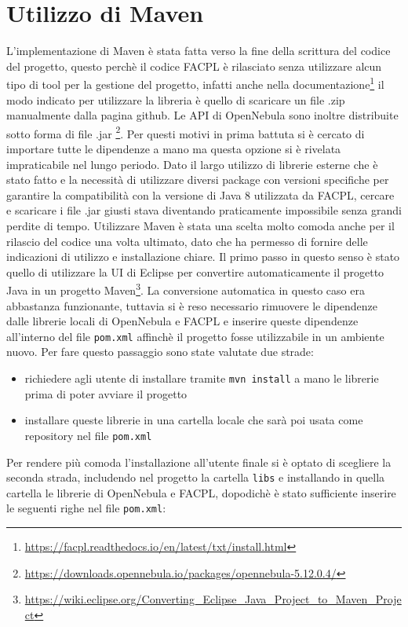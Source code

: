 \section{Utilizzo di Maven}
L'implementazione di Maven\cite{maven} è stata fatta verso la fine della scrittura del codice del progetto, questo perchè il codice FACPL è rilasciato senza utilizzare alcun tipo di tool per la gestione del progetto, infatti anche nella documentazione\footnote{\url{https://facpl.readthedocs.io/en/latest/txt/install.html}} il modo indicato per utilizzare la libreria è quello di scaricare un file .zip manualmente dalla pagina github\cite{facpl-github}. Le API di OpenNebula sono inoltre distribuite sotto forma di file .jar \footnote{\url{https://downloads.opennebula.io/packages/opennebula-5.12.0.4/}}. Per questi motivi in prima battuta si è cercato di importare tutte le dipendenze a mano ma questa opzione si è rivelata impraticabile nel lungo periodo. Dato il largo utilizzo di librerie esterne che è stato fatto e la necessità di utilizzare diversi package con versioni specifiche per garantire la compatibilità con la versione di Java 8 utilizzata da FACPL, cercare e scaricare i file .jar giusti stava diventando praticamente impossibile senza grandi perdite di tempo.\medbreak
Utilizzare Maven è stata una scelta molto comoda anche per il rilascio del codice una volta ultimato, dato che ha permesso di fornire delle indicazioni di utilizzo e installazione chiare.\medbreak
Il primo passo in questo senso è stato quello di utilizzare la UI di Eclipse per convertire automaticamente il progetto Java in un progetto Maven\footnote{\url{https://wiki.eclipse.org/Converting_Eclipse_Java_Project_to_Maven_Project}}. La conversione automatica in questo caso era abbastanza funzionante, tuttavia si è reso necessario rimuovere le dipendenze dalle librerie locali di OpenNebula e FACPL e inserire queste dipendenze all'interno del file \texttt{pom.xml} affinchè il progetto fosse utilizzabile in un ambiente nuovo. Per fare questo passaggio sono state valutate due strade:
\begin{itemize}
    \item richiedere agli utente di installare tramite \texttt{mvn install} a mano le librerie prima di poter avviare il progetto
    \item installare queste librerie in una cartella locale che sarà poi usata come repository nel file \texttt{pom.xml}
\end{itemize}
Per rendere più comoda l'installazione all'utente finale si è optato di scegliere la seconda strada, includendo nel progetto la cartella \texttt{libs} e installando in quella cartella le librerie di OpenNebula e FACPL, dopodichè è stato sufficiente inserire le seguenti righe nel file \texttt{pom.xml}:
